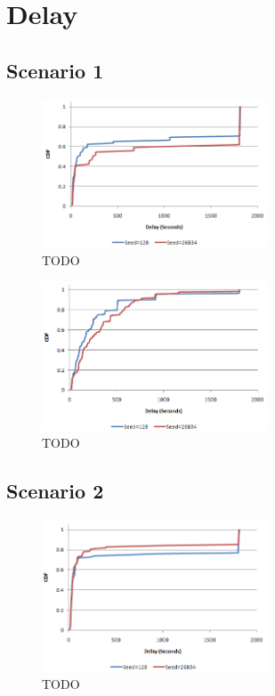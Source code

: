 \section{Delay}

\subsection{Scenario 1}

\begin{figure}[ht]
    \centering
    \includegraphics[width=0.6\textwidth]{images/result_delay_sim1byseed_mc3}
    \caption{TODO}
\end{figure}


\begin{figure}[ht]
    \centering
    \includegraphics[width=0.6\textwidth]{images/result_delay_sim1byseed_mc30}
    \caption{TODO}
\end{figure}

\subsection{Scenario 2}

\begin{figure}[ht]
    \centering
    \includegraphics[width=0.6\textwidth]{images/result_delay_sim2byseed_mc3}
    \caption{TODO}
\end{figure}


